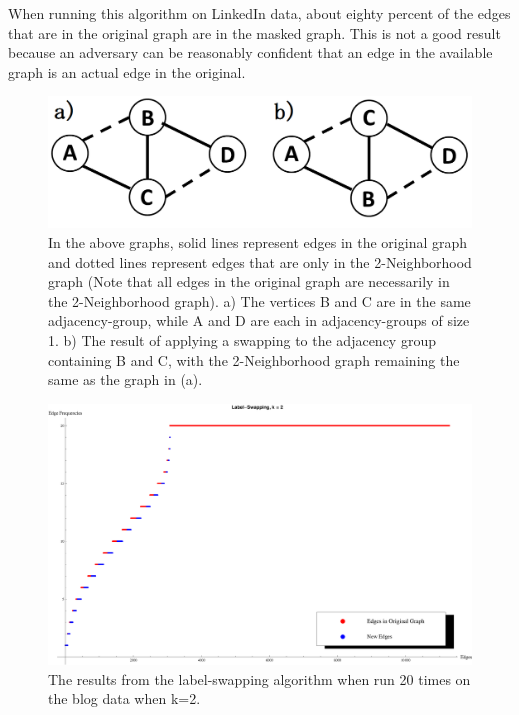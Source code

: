 \indent When running this algorithm on LinkedIn data, about eighty percent of the edges that are in the original graph are in the masked graph. This is not a good result because an adversary can be reasonably confident that an edge in the available graph is an actual edge in the original. \\

\begin{figure}[ht]
 \centerline{\includegraphics[scale=0.3 ]{Sample-Graph.png}}
  \caption{In the above graphs, solid lines represent edges in the original graph and dotted lines represent edges that are only in the 2-Neighborhood graph (Note that all edges in the original graph are necessarily in the 2-Neighborhood graph). a)  The vertices B and C are in the same adjacency-group, while A and D are each in adjacency-groups of size 1. b) The result of applying a swapping to the adjacency group containing B and C, with the 2-Neighborhood graph remaining the same as the graph in (a).}
  \label{fig:sample graph}
\end{figure}


\begin{figure}[ht]
\centerline{\includegraphics[scale=0.3 ]{s40_k_2_nomerge.eps}}
\caption{The results from the label-swapping algorithm when run 20 times on the blog data when k=2.}
 \label{fig:s40-k=2-label-swap}
\end{figure}



